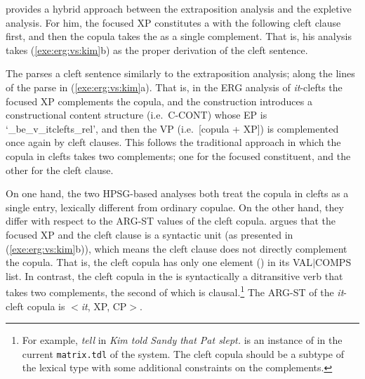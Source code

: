 

\noindent \citeauthor{kim:12a} provides a hybrid approach between the
extraposition analysis and the expletive analysis. For him, the
focused XP constitutes a  with the following cleft
clause first, and then the copula takes the  as a single
complement. That is, his analysis takes (\ref{exe:erg:vs:kim}b) as the
proper derivation of the cleft sentence.


The  parses a cleft sentence similarly to the extraposition
analysis; along the lines of the parse in
(\ref{exe:erg:vs:kim}a). That is, in the ERG analysis of
\textit{it}-clefts the focused XP complements the copula, and the
construction introduces a constructional content structure
(i.e.\ C-CONT) whose EP is `\_be\_v\_itclefts\_rel', and then the VP
(i.e.\ [copula + XP]) is complemented once again by cleft
clauses. This follows the traditional approach in which the copula in
clefts takes two complements; one for the focused constituent, and the
other for the cleft clause.




On one hand, the two HPSG-based analyses both treat the copula in
clefts as a single entry, lexically different from ordinary
copulae. On the other hand, they differ with respect to the ARG-ST
values of the cleft copula. \citet{kim:12a} argues that the
focused XP and the cleft clause is a syntactic unit (as presented in
(\ref{exe:erg:vs:kim}b)), which means the cleft clause does not
directly complement the copula. That is, the cleft copula has only one
element () in its \mbox{VAL{$\mid$}COMPS} list.  In
contrast, the cleft copula in the  is syntactically a
ditransitive verb that takes two complements, the second of which is
clausal.\footnote{For example, \textit{tell} in \textit{Kim told Sandy
    that Pat slept.} is an instance of
   in the current
  \texttt{matrix.tdl} of the \lingo {} system. The
  cleft copula should be a subtype of the lexical type with some
  additional constraints on the complements.} The ARG-ST of the
\textit{it}-cleft copula is \ensuremath{<}\textit{it}, XP,
CP\ensuremath{>}.



